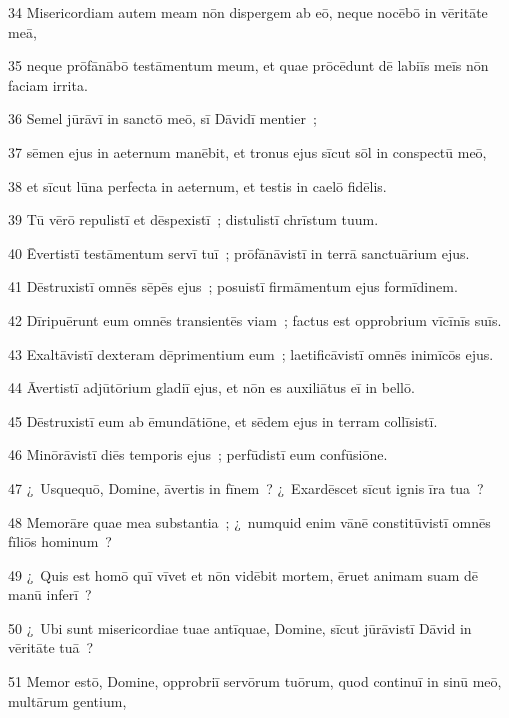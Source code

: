 \psalmVerse
  {\phantom{0}34}
  {Misericordiam autem meam nōn dispergem ab eō, neque nocēbō in vēritāte meā,}


\psalmVerse
  {\phantom{0}35}
  {neque prōfānābō testāmentum meum, et quae prōcēdunt dē labiīs meīs nōn faciam irrita.}


\psalmVerse
  {\phantom{0}36}
  {Semel jūrāvī in sanctō meō, sī Dāvidī mentier~;}


\psalmVerse
  {\phantom{0}37}
  {sēmen ejus in aeternum manēbit, et tronus ejus sīcut sōl in conspectū meō,}


\psalmVerse
  {\phantom{0}38}
  {et sīcut lūna perfecta in aeternum, et testis in caelō fidēlis.}


\psalmVerse
  {\phantom{0}39}
  {Tū vērō repulistī et dēspexistī~; distulistī chrīstum tuum.}


\psalmVerse
  {\phantom{0}40}
  {Ēvertistī testāmentum servī tuī~; prōfānāvistī in terrā sanctuārium ejus.}


\psalmVerse
  {\phantom{0}41}
  {Dēstruxistī omnēs sēpēs ejus~; posuistī firmāmentum ejus formīdinem.}


\psalmVerse
  {\phantom{0}42}
  {Dīripuērunt eum omnēs transientēs viam~; factus est opprobrium vīcīnīs suīs.}


\psalmVerse
  {\phantom{0}43}
  {Exaltāvistī dexteram dēprimentium eum~; laetificāvistī omnēs inimīcōs ejus.}


\psalmVerse
  {\phantom{0}44}
  {Āvertistī adjūtōrium gladiī ejus, et nōn es auxiliātus eī in bellō.}


\psalmVerse
  {\phantom{0}45}
  {Dēstruxistī eum ab ēmundātiōne, et sēdem ejus in terram collīsistī.}


\psalmVerse
  {\phantom{0}46}
  {Minōrāvistī diēs temporis ejus~; perfūdistī eum confūsiōne.}


\psalmVerse
  {\phantom{0}47}
  {¿~Usquequō, Domine, āvertis in fīnem~? ¿~Exardēscet sīcut ignis īra tua~?}


\psalmVerse
  {\phantom{0}48}
  {Memorāre quae mea substantia~; ¿~numquid enim vānē constitūvistī omnēs fīliōs hominum~?}


\psalmVerse
  {\phantom{0}49}
  {¿~Quis est homō quī vīvet et nōn vidēbit mortem, ēruet animam suam dē manū inferī~?}


\psalmVerse
  {\phantom{0}50}
  {¿~Ubi sunt misericordiae tuae antīquae, Domine, sīcut jūrāvistī Dāvid in vēritāte tuā~?}


\psalmVerse
  {\phantom{0}51}
  {Memor estō, Domine, opprobriī servōrum tuōrum, quod continuī in sinū meō, multārum gentium,}


